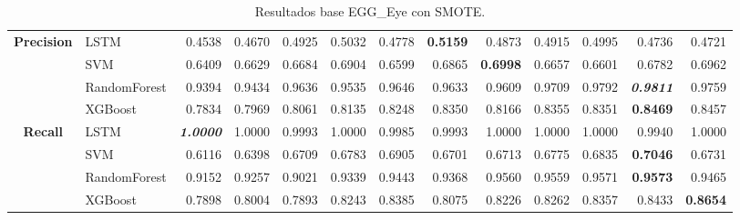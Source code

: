 \begin{table}[H]
\begin{adjustbox}{max width=14cm}
\begin{tabular}{|c|l|r|r|r|r|r|r|r|r|r|r|r|}
			\hline
			\textbf{Precision} &  LSTM &  0.4538 &  0.4670 &  0.4925 &  0.5032 &  0.4778 & \textbf{  0.5159 } &  0.4873 &  0.4915 &  0.4995 &  0.4736 &  0.4721 \\
			&  SVM &  0.6409 &  0.6629 &  0.6684 &  0.6904 &  0.6599 &  0.6865 & \textbf{  0.6998 } &  0.6657 &  0.6601 &  0.6782 &  0.6962 \\
			&  RandomForest &  0.9394 &  0.9434 &  0.9636 &  0.9535 &  0.9646 &  0.9633 &  0.9609 &  0.9709 &  0.9792 & \textit{ \textbf{  0.9811 } } &  0.9759 \\
			&  XGBoost &  0.7834 &  0.7969 &  0.8061 &  0.8135 &  0.8248 &  0.8350 &  0.8166 &  0.8355 &  0.8351 & \textbf{  0.8469 } &  0.8457 \\
			\hline
			\textbf{Recall} &  LSTM & \textit{ \textbf{  1.0000 } } &  1.0000 &  0.9993 &  1.0000 &  0.9985 &  0.9993 &  1.0000 &  1.0000 &  1.0000 &  0.9940 &  1.0000 \\
			&  SVM &  0.6116 &  0.6398 &  0.6709 &  0.6783 &  0.6905 &  0.6701 &  0.6713 &  0.6775 &  0.6835 & \textbf{  0.7046 } &  0.6731 \\
			&  RandomForest &  0.9152 &  0.9257 &  0.9021 &  0.9339 &  0.9443 &  0.9368 &  0.9560 &  0.9559 &  0.9571 & \textbf{  0.9573 } &  0.9465 \\
			&  XGBoost &  0.7898 &  0.8004 &  0.7893 &  0.8243 &  0.8385 &  0.8075 &  0.8226 &  0.8262 &  0.8357 &  0.8433 & \textbf{  0.8654 } \\
			\hline
		\end{tabular}
	\end{adjustbox}
	\caption{Resultados base EGG\_Eye con SMOTE.}
	\label{tab:EGGEyeSMOTE}
\end{table}

